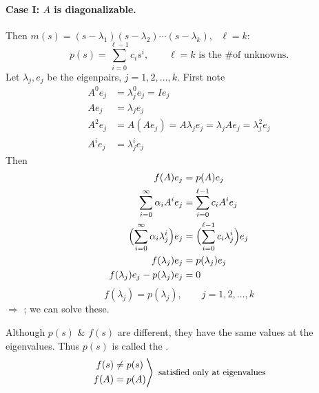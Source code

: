 \paragraph{Case I: $A$ is diagonalizable.} Then $m(s) = (s-\lambda_1)(s-\lambda_2)\cdots(s-\lambda_k)$, \ $\ell = k$:
\[
p(s) = \sum_{i=0}^{\ell-1}c_i s^i, \qquad \ell = k \text{ is the \# of unknowns.}
\]
Let $\lambda_j, e_j$ be the eigenpairs, $j = 1,2,\dots,k$. First note
\begin{align*}
A^0 e_j &= \lambda_j^0 e_j = Ie_j\\
A e_j &= \lambda_j e_j\\
A^2 e_j &= A(Ae_j) = A\lambda_j e_j = \lambda_j Ae_j = \lambda_j^2 e_j\\
A^i e_j &= \lambda_j^i e_j
\end{align*}
Then
\begin{align*}
f(A)e_j &= p(A)e_j\\
\sum_{i=0}^{\infty}\alpha_i A^i e_j &= \sum_{i=0}^{\ell-1}c_i A^i e_j\\
\Bigl(\sum_{i=0}^{\infty}\alpha_i\lambda_j^i\Bigr)e_j &= \Bigl(\sum_{i=0}^{\ell-1}c_i\lambda_j^i\Bigr)e_j\\
f(\lambda_j)e_j &= p(\lambda_j)e_j\\
f(\lambda_j)e_j - p(\lambda_j)e_j &= 0
\end{align*}
\[
\boxed{f(\lambda_j) = p(\lambda_j)}, \qquad j = 1,2,\dots,k
\]
$\Rightarrow$ ; we can solve these.

\begin{center}
\begin{minipage}{0.44\textwidth}
\centering
{}
\end{minipage}\hfill
\begin{minipage}{0.52\textwidth}
Although $p(s)$ \& $f(s)$ are different, they have the same values at the eigenvalues. Thus $p(s)$ is called the .
\[
\left.\begin{aligned} f(s) &\neq p(s)\\ f(A) &= p(A)\end{aligned}\right\rangle
\ \text{\small satisfied only at eigenvalues}
\]
\end{minipage}
\end{center}

